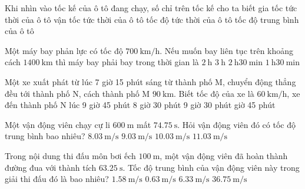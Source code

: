 \begin{ex}
	Khi nhìn vào tốc kế của ô tô đang chạy, số chỉ trên tốc kế cho ta biết
	\choice
	{gia tốc tức thời của ô tô}
	{vận tốc tức thời của ô tô}
	{\True tốc độ tức thời của ô tô}
	{tốc độ trung bình của ô tô}
	\loigiai{
	}
\end{ex}

\begin{ex}
	Một máy bay phản lực có tốc độ $\SI{700}{\kilo\meter/\hour}$. Nếu muốn bay liên tục trên khoảng cách $\SI{1400}{\kilo\meter}$ thì máy bay phải bay trong thời gian là
	\choice
	{\True $\SI{2}{\hour}$}
	{$\SI{3}{\hour}$}
	{$\SI{2}{\hour}\SI{30}{\minute}$}
	{$\SI{1}{\hour}\SI{30}{\minute}$}
\end{ex}

\begin{ex}
	Một xe xuất phát từ lúc 7 giờ 15 phút sáng từ thành phố M, chuyển động thẳng đều tới thành phố N, cách thành phố M $\SI{90}{\kilo\meter}$. Biết tốc độ của xe là $\SI{60}{\kilo\meter/\hour}$, xe đến thành phố N lúc
	\choice
	{9 giờ 45 phút}
	{8 giờ 30 phút}
	{9 giờ 30 phút}
	{ giờ 45 phút}
\end{ex}

\begin{ex}
	Một vận động viên chạy cự li $\SI{600}{\meter}$ mất $\SI{74.75}{\second}$. Hỏi vận động viên đó có tốc độ trung bình bao nhiêu?
	\choice
	{\True $\SI{8.03}{\meter/\second}$}
	{$\SI{9.03}{\meter/\second}$}
	{$\SI{10.03}{\meter/\second}$}
	{$\SI{11.03}{\meter/\second}$}
\end{ex}

\begin{ex}
	Trong nội dung thi đấu môn bơi ếch $\SI{100}{\meter}$, một vận động viên đã hoàn thành đường đua với thành tích $\SI{63.25}{\second}$. Tốc độ trung bình của vận động viên này trong giải thi đấu đó là bao nhiêu?
	\choice
	{\True $\SI{1.58}{\meter/\second}$}
	{$\SI{0.63}{\meter/\second}$}
	{$\SI{6.33}{\meter/\second}$}
	{$\SI{36.75}{\meter/\second}$}
\end{ex}


